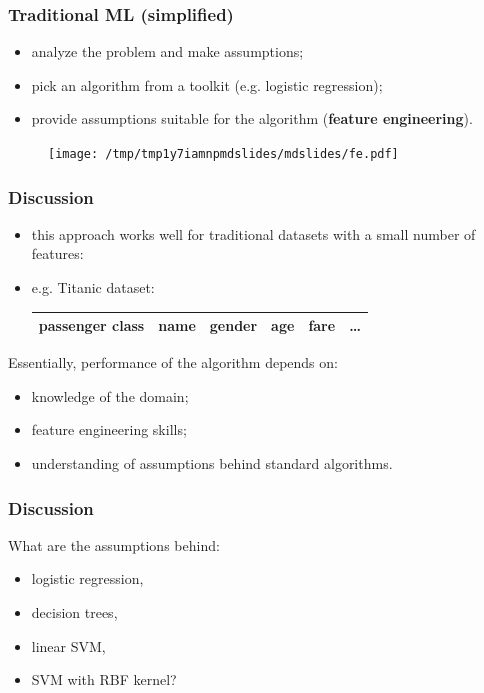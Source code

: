 \documentclass[mathserif, aspectratio=43]{beamer}
\begin{document}
\begin{frame}[fragile]
\frametitle{Traditional ML (simplified)}
\begin{itemize}
\item analyze the problem and make assumptions;
\item pick an algorithm from a toolkit (e.g. logistic regression);
\item provide assumptions suitable for the algorithm (\textbf{feature engineering}).
\end{itemize}
\begin{figure}
\centering
\texttt{[image: /tmp/tmp1y7iamnpmdslides/mdslides/fe.pdf]}

\end{figure}


\end{frame}


\begin{frame}[fragile]
\frametitle{Discussion}
\begin{itemize}
\item this approach works well for traditional datasets with a small number of features:
\item e.g. Titanic dataset:\\\begin{center}
\begin{tabular}{|c | c | c | c | c | c|}
\hline
passenger class & name & gender & age & fare & \dots\\
\hline
\end{tabular}
\end{center}

\end{itemize}
Essentially, performance of the algorithm depends on:
\begin{itemize}
\item knowledge of the domain;
\item feature engineering skills;
\item understanding of assumptions behind standard algorithms.
\end{itemize}

\end{frame}


\begin{frame}[fragile]
\frametitle{Discussion}
What are the assumptions behind:
\begin{itemize}
\item logistic regression,
\item decision trees,
\item linear SVM,
\item SVM with RBF kernel?
\end{itemize}

\end{frame}
\end{document}
